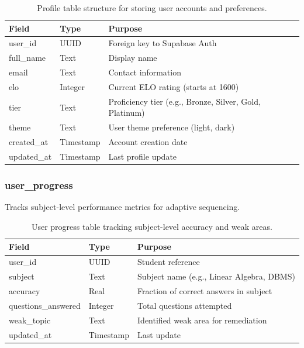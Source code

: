 \documentclass[sigconf,authordraft,twoside]{acmart}
\begin{document}
\begin{table}[t]
\centering
\small
\begin{tabularx}{\columnwidth}{>{\raggedright\arraybackslash}p{} >{\raggedright\arraybackslash}p{} X}
\toprule
\textbf{Field} & \textbf{Type} & \textbf{Purpose} \\
\midrule
user\_id & UUID & Foreign key to Supabase Auth \\
full\_name & Text & Display name \\
email & Text & Contact information \\
elo & Integer & Current ELO rating (starts at 1600) \\
tier & Text & Proficiency tier (e.g., Bronze, Silver, Gold, Platinum) \\
theme & Text & User theme preference (light, dark) \\
created\_at & Timestamp & Account creation date \\
updated\_at & Timestamp & Last profile update \\
\bottomrule
\end{tabularx}
\caption{Profile table structure for storing user accounts and preferences.}
\end{table}

\subsubsection{user\_progress}
Tracks subject-level performance metrics for adaptive sequencing.

\begin{table}[t]
\centering
\small
\begin{tabularx}{\columnwidth}{>{\raggedright\arraybackslash}p{} >{\raggedright\arraybackslash}p{} X}
\toprule
\textbf{Field} & \textbf{Type} & \textbf{Purpose} \\
\midrule
user\_id & UUID & Student reference \\
subject & Text & Subject name (e.g., Linear Algebra, DBMS) \\
accuracy & Real & Fraction of correct answers in subject \\
questions\_answered & Integer & Total questions attempted \\
weak\_topic & Text & Identified weak area for remediation \\
updated\_at & Timestamp & Last update \\
\bottomrule
\end{tabularx}
\caption{User progress table tracking subject-level accuracy and weak areas.}
\end{table}
\end{document}
